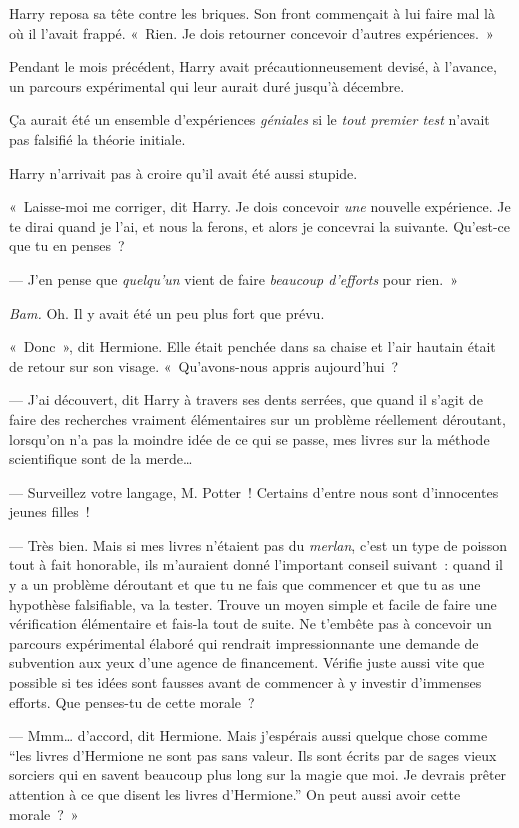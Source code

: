 Harry reposa sa tête contre les briques. Son front commençait à lui faire mal là où il l'avait frappé. «~Rien. Je dois retourner concevoir d'autres expériences.~»

Pendant le mois précédent, Harry avait précautionneusement devisé, à l'avance, un parcours expérimental qui leur aurait duré jusqu'à décembre.

Ça aurait été un ensemble d'expériences \emph{géniales} si le \emph{tout premier test} n'avait pas falsifié la théorie initiale.

Harry n'arrivait pas à croire qu'il avait été aussi stupide.

«~Laisse-moi me corriger, dit Harry. Je dois concevoir \emph{une} nouvelle expérience. Je te dirai quand je l'ai, et nous la ferons, et alors je concevrai la suivante. Qu'est-ce que tu en penses~?

--- J'en pense que \emph{quelqu'un} vient de faire \emph{beaucoup d'efforts} pour rien.~»

\emph{Bam.} Oh. Il y avait été un peu plus fort que prévu.

«~Donc~», dit Hermione. Elle était penchée dans sa chaise et l'air hautain était de retour sur son visage. «~Qu'avons-nous appris aujourd'hui~?

--- J'ai découvert, dit Harry à travers ses dents serrées, que quand il s'agit de faire des recherches vraiment élémentaires sur un problème réellement déroutant, lorsqu'on n'a pas la moindre idée de ce qui se passe, mes livres sur la méthode scientifique sont de la merde…

--- Surveillez votre langage, M. Potter~! Certains d'entre nous sont d'innocentes jeunes filles~!

--- Très bien. Mais si mes livres n'étaient pas du \emph{merlan}, c'est un type de poisson tout à fait honorable, ils m'auraient donné l'important conseil suivant~: quand il y a un problème déroutant et que tu ne fais que commencer et que tu as une hypothèse falsifiable, va la tester. Trouve un moyen simple et facile de faire une vérification élémentaire et fais-la tout de suite. Ne t'embête pas à concevoir un parcours expérimental élaboré qui rendrait impressionnante une demande de subvention aux yeux d'une agence de financement. Vérifie juste aussi vite que possible si tes idées sont fausses avant de commencer à y investir d'immenses efforts. Que penses-tu de cette morale~?

--- Mmm… d'accord, dit Hermione. Mais j'espérais aussi quelque chose comme “les livres d'Hermione ne sont pas sans valeur. Ils sont écrits par de sages vieux sorciers qui en savent beaucoup plus long sur la magie que moi. Je devrais prêter attention à ce que disent les livres d'Hermione.” On peut aussi avoir cette morale~?~»

